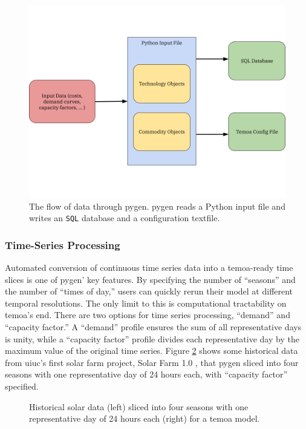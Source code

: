 \begin{figure}[H]
  \centering
  \includegraphics[width=0.8\columnwidth]{figures/pygen-outline.png}
  \caption{The flow of data through \gls{pygen}. \gls{pygen} reads a Python
  input file and writes an \texttt{SQL} database and a configuration textfile.}
  \label{fig:pygen-flow}
\end{figure}


\subsubsection{Time-Series Processing}
Automated conversion of continuous time series data into a \gls{temoa}-ready
time slices is one of \gls{pygen}' key features. By specifying the number of ``seasons''
and the number of ``times of day,'' users can quickly rerun their model at different
temporal resolutions. The only limit to this is computational tractability on
\gls{temoa}'s end. There are two options for time series processing, ``demand'' and
``capacity factor.'' A ``demand'' profile ensures the sum of all representative days is
unity, while a ``capacity factor'' profile divides each representative day by the
maximum value of the original time series.
Figure \ref{fig:solar-timeslice} shows some historical data from \gls{uiuc}'s
first solar farm project, Solar Farm 1.0 \cite{white_solar_2017}, that \gls{pygen}
sliced into four seasons with one representative day of 24 hours each, with ``capacity
factor'' specified.
\begin{figure}[H]
  \resizebox{\textwidth}{!}{}
  \caption{Historical solar data (left) sliced into four seasons with one
  representative day of 24 hours each (right) for a \gls{temoa} model.}
  \label{fig:solar-timeslice}
\end{figure}

